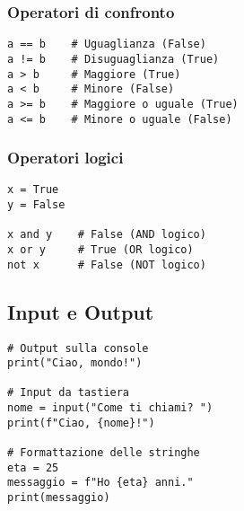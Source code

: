 \subsubsection{Operatori di confronto}
\begin{lstlisting}
a == b    # Uguaglianza (False)
a != b    # Disuguaglianza (True)
a > b     # Maggiore (True)
a < b     # Minore (False)
a >= b    # Maggiore o uguale (True)
a <= b    # Minore o uguale (False)
\end{lstlisting}

\subsubsection{Operatori logici}\label{opLogici}
\begin{lstlisting}
x = True
y = False

x and y    # False (AND logico)
x or y     # True (OR logico)
not x      # False (NOT logico)
\end{lstlisting}


\subsection{Input e Output}\label{InputOutput}
\begin{lstlisting}
# Output sulla console
print("Ciao, mondo!")

# Input da tastiera
nome = input("Come ti chiami? ")
print(f"Ciao, {nome}!")

# Formattazione delle stringhe
eta = 25
messaggio = f"Ho {eta} anni."
print(messaggio)
\end{lstlisting}